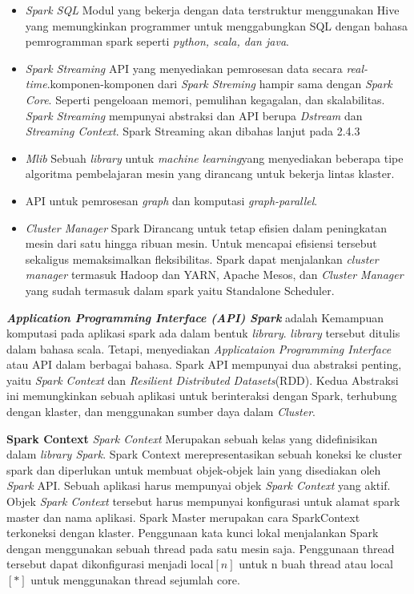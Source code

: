 \documentclass[a4paper,twoside]{article}
\begin{document}
\begin{enumerate}
\begin{itemize}
		\item{\textit{Spark SQL} Modul yang bekerja dengan data terstruktur menggunakan Hive yang 				memungkinkan programmer untuk menggabungkan SQL dengan bahasa pemrogramman spark seperti 				\textit{python, scala, dan 	java}.}
	
		\item{\textit{Spark Streaming} API yang menyediakan pemrosesan data secara \textit{real-				time}.komponen-komponen dari \textit{Spark Streming} hampir sama dengan \textit{Spark Core}. 		Seperti pengeloaan memori, pemulihan kegagalan, dan skalabilitas. \textit{Spark Streaming} 				mempunyai abstraksi dan API berupa \textit{Dstream} dan \textit{Streaming Context}. Spark 				Streaming akan dibahas lanjut pada 2.4.3}
	
		\item{\textit{Mlib} Sebuah \textit{library} untuk \textit{machine learning}yang menyediakan 			beberapa tipe algoritma pembelajaran mesin yang dirancang untuk bekerja lintas klaster.}
	
		\item API untuk pemrosesan \textit{graph} dan komputasi \textit{graph-parallel}.
	
		\item{\textit{Cluster Manager} Spark Dirancang untuk tetap efisien dalam peningkatan mesin 				dari satu hingga ribuan mesin. Untuk mencapai efisiensi tersebut sekaligus memaksimalkan 				fleksibilitas. Spark dapat menjalankan \textit{cluster manager} termasuk Hadoop dan YARN, 				Apache Mesos, dan 	\textit{Cluster Manager} yang sudah termasuk dalam spark yaitu 						Standalone Scheduler.}
	\end{itemize}
	
	\textit{\textbf{Application Programming Interface (API) Spark}} adalah Kemampuan komputasi pada 		aplikasi spark ada dalam bentuk \textit{library}. \textit{library} tersebut ditulis dalam bahasa 	scala. 	Tetapi, menyediakan \textit{Applicataion Programming Interface} atau API dalam berbagai 		bahasa. Spark API mempunyai dua abstraksi penting, yaitu \textit{Spark Context} dan 					\textit{Resilient Distributed Datasets}(RDD). Kedua Abstraksi ini memungkinkan sebuah aplikasi 			untuk berinteraksi dengan Spark, terhubung dengan klaster, dan menggunakan sumber daya dalam 			\textit{Cluster}.
	
	\textbf{Spark Context}\newline
	\textit{Spark Context} Merupakan sebuah kelas yang didefinisikan dalam \textit{library Spark}. 			Spark Context merepresentasikan sebuah koneksi ke cluster spark dan diperlukan untuk membuat 			objek-objek lain yang disediakan oleh \textit{Spark} API. Sebuah aplikasi harus mempunyai objek 		\textit{Spark Context} yang aktif. Objek \textit{Spark Context} tersebut harus mempunyai 				konfigurasi untuk alamat spark master dan nama aplikasi. Spark Master merupakan cara 					SparkContext terkoneksi dengan klaster. Penggunaan kata kunci lokal menjalankan Spark dengan 			menggunakan sebuah thread pada satu mesin saja. Penggunaan thread tersebut dapat dikonfigurasi 			menjadi local$[n]$ untuk n buah thread atau local$[*]$ untuk menggunakan thread sejumlah core.
	

\end{enumerate}
\end{document}
